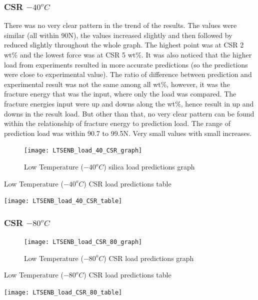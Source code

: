 \documentclass[numbers=noendperiod,chapterprefix=on]{icldt} %
\begin{document}
\subsubsection{CSR $ -40 ^{o}C$}
There was no very clear pattern in the trend of the results. The values were similar (all within 90N), the values increased slightly and then followed by reduced slightly throughout the whole graph. The highest point was at CSR 2 wt\% and the lowest force was at CSR 5 wt\%. It was also noticed that the higher load from experiments resulted in more accurate predictions (so the predictions were close to experimental value). The ratio of difference between prediction and experimental result was not the same among all wt\%, however, it was the fracture energy that was the input, where only the load was compared. The fracture energies input were up and downs along the wt\%, hence result in up and downs in the result load. But other than that, no very clear pattern can be found within the relationship of fracture energy to prediction load.
The range of prediction load was within 90.7 to 99.5N. Very small values with small increases.

\begin{figure}[!hp]
  \centering
  \texttt{[image: LTSENB\_load\_40\_CSR\_graph]}\label{LTSENB_load_40_CSR_graph}
  \caption{Low Temperature ($ -40 ^{o}C$) silica load predictions graph}
  \end{figure}
  \FloatBarrier
 
 \begin{table}
   \centering
   \caption{Low Temperature ($ -40 ^{o}C$) CSR load predictions table}\label{LTSENB_load_40_CSR_table}
   \texttt{[image: LTSENB\_load\_40\_CSR\_table]}
   \end{table}
   \FloatBarrier

\subsubsection{CSR $ -80 ^{o}C$}

\begin{figure}[!hp]
  \centering
  \texttt{[image: LTSENB\_load\_CSR\_80\_graph]}\label{LTSENB_load_CSR_80_graph}
  \caption{Low Temperature ($ -80 ^{o}C$) CSR load predictions graph}
  \end{figure}
 \FloatBarrier
 
 \begin{table}
   \centering
   \caption{Low Temperature ($ -80 ^{o}C$) CSR load predictions table}\label{LTSENB_load_80_CSR_table}
   \texttt{[image: LTSENB\_load\_CSR\_80\_table]}
   \end{table}
   \FloatBarrier
   
\end{document}
